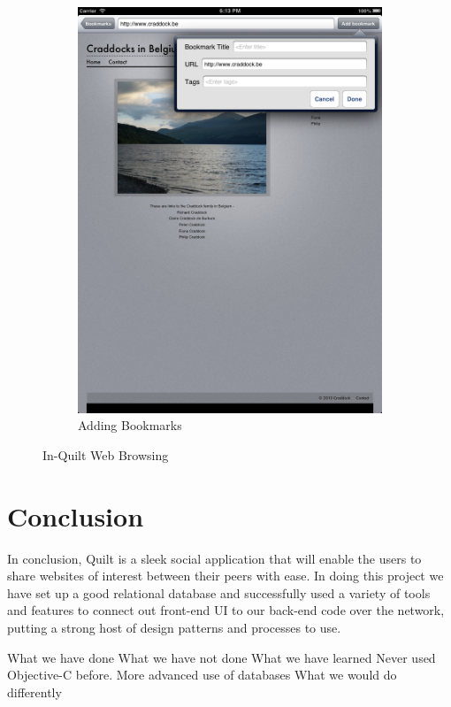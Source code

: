 \documentclass[a4wide, 10pt]{article}
\begin{document}
\begin{figure}
\begin{subfigure}[b]{0.4\textwidth}
                \includegraphics[width=\textwidth]{"screenshots/App Browsing"}
                \caption{Adding Bookmarks}
        \end{subfigure}
        \caption{In-Quilt Web Browsing}\label{fig:browse}
\end{figure}

\section{Conclusion}

In conclusion, Quilt is a sleek social application that will enable the users to share websites of interest between their peers with ease. In doing this project we have set up a good relational database and successfully used a variety of tools and features to connect out front-end UI to our back-end code over the network, putting a strong host of design patterns and processes to use. 

	What we have done
	What we have not done
	What we have learned
		Never used Objective-C before.
		More advanced use of databases
	What we would do differently
	
\end{document}
